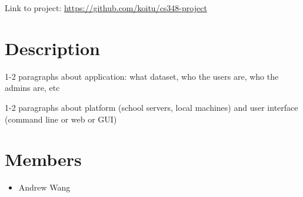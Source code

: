 \documentclass[11pt]{article}
\begin{document}
Link to project: \url{https://github.com/koitu/cs348-project}

\section{Description}
1-2 paragraphs about application: what dataset, who the users are, who the admins are, etc

1-2 paragraphs about platform (school servers, local machines) and user interface (command line or web or GUI)

\section{Members}
\begin{itemize}
    \item Andrew Wang
\end{itemize}
\end{document}
